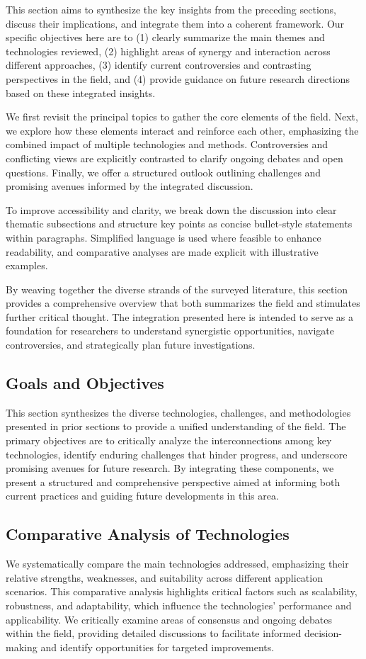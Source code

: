 \documentclass[sigconf]{acmart}
\begin{document}
This section aims to synthesize the key insights from the preceding sections, discuss their implications, and integrate them into a coherent framework. Our specific objectives here are to (1) clearly summarize the main themes and technologies reviewed, (2) highlight areas of synergy and interaction across different approaches, (3) identify current controversies and contrasting perspectives in the field, and (4) provide guidance on future research directions based on these integrated insights.

We first revisit the principal topics to gather the core elements of the field. Next, we explore how these elements interact and reinforce each other, emphasizing the combined impact of multiple technologies and methods. Controversies and conflicting views are explicitly contrasted to clarify ongoing debates and open questions. Finally, we offer a structured outlook outlining challenges and promising avenues informed by the integrated discussion.

To improve accessibility and clarity, we break down the discussion into clear thematic subsections and structure key points as concise bullet-style statements within paragraphs. Simplified language is used where feasible to enhance readability, and comparative analyses are made explicit with illustrative examples.

By weaving together the diverse strands of the surveyed literature, this section provides a comprehensive overview that both summarizes the field and stimulates further critical thought. The integration presented here is intended to serve as a foundation for researchers to understand synergistic opportunities, navigate controversies, and strategically plan future investigations.

\subsection{Goals and Objectives}
This section synthesizes the diverse technologies, challenges, and methodologies presented in prior sections to provide a unified understanding of the field. The primary objectives are to critically analyze the interconnections among key technologies, identify enduring challenges that hinder progress, and underscore promising avenues for future research. By integrating these components, we present a structured and comprehensive perspective aimed at informing both current practices and guiding future developments in this area.

\subsection{Comparative Analysis of Technologies}
We systematically compare the main technologies addressed, emphasizing their relative strengths, weaknesses, and suitability across different application scenarios. This comparative analysis highlights critical factors such as scalability, robustness, and adaptability, which influence the technologies' performance and applicability. We critically examine areas of consensus and ongoing debates within the field, providing detailed discussions to facilitate informed decision-making and identify opportunities for targeted improvements.
\end{document}
